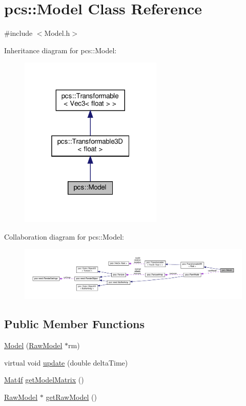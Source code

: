 \hypertarget{classpcs_1_1Model}{}\section{pcs\+:\+:Model Class Reference}
\label{classpcs_1_1Model}


{\ttfamily \#include $<$Model.\+h$>$}



Inheritance diagram for pcs\+:\+:Model\+:\nopagebreak
\begin{figure}[H]
\begin{center}
\leavevmode
\includegraphics[width=193pt]{classpcs_1_1Model__inherit__graph}
\end{center}
\end{figure}


Collaboration diagram for pcs\+:\+:Model\+:\nopagebreak
\begin{figure}[H]
\begin{center}
\leavevmode
\includegraphics[width=350pt]{classpcs_1_1Model__coll__graph}
\end{center}
\end{figure}
\subsection*{Public Member Functions}
\begin{DoxyCompactItemize}
\item 
\hyperlink{classpcs_1_1Model_a353c041e246baa1bc4ab54b23918dfb9}{Model} (\hyperlink{classpcs_1_1RawModel}{Raw\+Model} $\ast$rm)
\item 
virtual void \hyperlink{classpcs_1_1Model_a143831f415158255b910e25ac542de19}{update} (double delta\+Time)
\item 
\hyperlink{structpcs_1_1Mat4f}{Mat4f} \hyperlink{classpcs_1_1Model_a70cb396d1e636d013ec22257be078120}{get\+Model\+Matrix} ()
\item 
\hyperlink{classpcs_1_1RawModel}{Raw\+Model} $\ast$ \hyperlink{classpcs_1_1Model_aaffd9c9e96661db20405c0c12138c940}{get\+Raw\+Model} ()
\end{DoxyCompactItemize}
